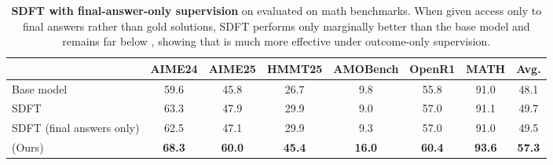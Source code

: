\def\changesize#1{\fontsize{#1}{10.5pt}\selectfont}
\begin{table}[h]
\centering
\small
\fontsize{9pt}{10.5pt}\selectfont
    \renewcommand{\arraystretch}{1.2}
    \setlength{\tabcolsep}{2pt}
\begin{tabular}{lccccccc}
\toprule
\cmidrule(lr){2-7}
 & {AIME24} & {AIME25} & {HMMT25} & {AMOBench} & {OpenR1} & {MATH} & \textbf{Avg.}\\
\midrule

Base model                                           & 59.6          & 45.8          & 26.7          & 9.8           & 55.8 & 91.0          & 48.1          \\
SDFT                                                 & 63.3          & 47.9          & 29.9          & 9.0           & 57.0 & 91.1          & 49.7          \\
SDFT (final answers only)                           & 62.5          & 47.1          & 29.9          & 9.3           & 57.0 & 91.0          & 49.5          \\
\ours{} (Ours)                                      & \textbf{68.3} & \textbf{60.0} & \textbf{45.4} & \textbf{16.0} & \textbf{60.4} & \textbf{93.6} & \textbf{57.3} \\

\bottomrule
\end{tabular}
\caption{\textbf{SDFT with final-answer-only supervision} on \qwen{} evaluated on math benchmarks. When given access only to final answers rather than gold solutions, SDFT performs only marginally better than the base model and remains far below \ours{}, showing that \ours{} is much more effective under outcome-only supervision.}
\label{tab:sdft_final_answers}
\end{table}